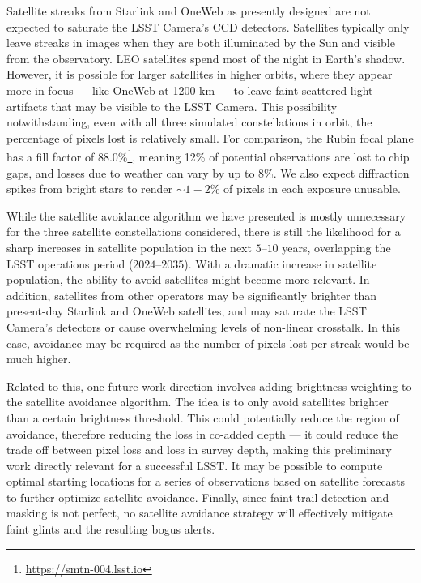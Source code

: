 \documentclass[twocolumn]{aastex631}
\begin{document}
Satellite streaks from Starlink and OneWeb as presently designed are not expected to saturate the LSST Camera's CCD detectors. Satellites typically only leave streaks in images when they are both illuminated by the Sun and visible from the observatory. LEO satellites spend most of the night in Earth's shadow.
However, it is possible for larger satellites in higher orbits, where they appear more in focus --- like OneWeb at 1200 km --- to leave faint scattered light artifacts that may be visible to the LSST Camera.
This possibility notwithstanding, even with all three simulated constellations in orbit, the percentage of pixels lost is relatively small. For comparison, the Rubin focal plane has a fill factor of 88.0\%\footnote{\url{https://smtn-004.lsst.io}}, meaning 12\% of potential observations are lost to chip gaps, and losses due to weather can vary by up to 8\%. We also expect diffraction spikes from bright stars to render $\sim 1-2$\% of pixels in each exposure unusable.

While the satellite avoidance algorithm we have presented is mostly unnecessary for the three satellite constellations considered, there is still the likelihood for a sharp increases in satellite population in the next $5–10$ years, overlapping the LSST operations period ($2024–2035$). With a dramatic increase in satellite population, the ability to avoid satellites might become more relevant. In addition, satellites from other operators may be significantly brighter than present-day Starlink and OneWeb satellites, and may saturate the LSST Camera’s detectors or cause overwhelming levels of non-linear crosstalk. In this case, avoidance may be required as the number of pixels lost per streak would be much higher.

Related to this, one future work direction involves adding brightness weighting to the satellite avoidance algorithm. The idea is to only avoid satellites brighter than a certain brightness threshold. This could potentially reduce the region of avoidance, therefore reducing the loss in co-added depth --- it could reduce the trade off between pixel loss and loss in survey depth, making this preliminary work directly relevant for a successful LSST. It may be possible to compute optimal starting locations for a series of observations based on satellite forecasts to further optimize satellite avoidance. Finally, since faint trail detection and masking is not perfect, no satellite avoidance strategy will effectively mitigate faint glints and the resulting bogus alerts.
\end{document}
